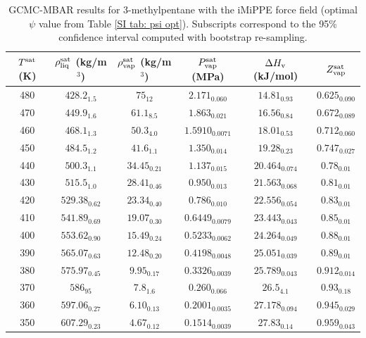 \documentclass[journal=jctc,manuscript=article]{achemso}
\begin{document}
\begin{table}[htb!]
	\caption{GCMC-MBAR results for 3-methylpentane with the iMiPPE force field (optimal $\psi$ value from Table \ref{SI tab: psi opt}). Subscripts correspond to the 95\% confidence interval computed with bootstrap re-sampling.}
	\begin{center}
		\begin{tabular}{|c|c|c|c|c|c|}
			\hline
			$T^{\rm sat}$ (K) & $\rho_{\rm liq}^{\rm sat}$ (kg/m$^3$) & $\rho_{\rm vap}^{\rm sat}$ (kg/m$^3$) & $P_{\rm vap}^{\rm sat}$ (MPa) & $\Delta H_{\rm v}$ (kJ/mol) & $Z_{\rm vap}^{\rm sat}$ \\ \hline
			480 & $428.2_{1.5}$ & $75_{12}$ & $2.171_{0.060}$ & $14.81_{0.93}$ & $0.625_{0.090}$ \\
			470 & $449.9_{1.6}$ & $61.1_{8.5}$ & $1.863_{0.021}$ & $16.56_{0.84}$ & $0.672_{0.089}$ \\
			460 & $468.1_{1.3}$ & $50.3_{4.0}$ & $1.5910_{0.0071}$ & $18.01_{0.53}$ & $0.712_{0.060}$ \\
			450 & $484.5_{1.2}$ & $41.6_{1.1}$ & $1.350_{0.014}$ & $19.28_{0.23}$ & $0.747_{0.027}$ \\
			440 & $500.3_{1.1}$ & $34.45_{0.21}$ & $1.137_{0.015}$ & $20.464_{0.074}$ & $0.78_{0.01}$ \\
			430 & $515.5_{1.0}$ & $28.41_{0.46}$ & $0.950_{0.013}$ & $21.563_{0.068}$ & $0.81_{0.01}$ \\
			420 & $529.38_{0.62}$ & $23.34_{0.40}$ & $0.786_{0.010}$ & $22.556_{0.054}$ & $0.83_{0.01}$ \\
			410 & $541.89_{0.69}$ & $19.07_{0.30}$ & $0.6449_{0.0079}$ & $23.443_{0.043}$ & $0.85_{0.01}$ \\
			400 & $553.62_{0.90}$ & $15.49_{0.24}$ & $0.5233_{0.0062}$ & $24.264_{0.049}$ & $0.88_{0.01}$ \\
			390 & $565.07_{0.63}$ & $12.48_{0.20}$ & $0.4198_{0.0048}$ & $25.051_{0.039}$ & $0.89_{0.01}$ \\
			380 & $575.97_{0.45}$ & $9.95_{0.17}$ & $0.3326_{0.0039}$ & $25.789_{0.043}$ & $0.912_{0.014}$ \\
			370 & $586_{95}$ & $7.8_{1.6}$ & $0.260_{0.066}$ & $26.5_{4.1}$ & $0.93_{0.18}$ \\
			360 & $597.06_{0.27}$ & $6.10_{0.13}$ & $0.2001_{0.0035}$ & $27.178_{0.094}$ & $0.945_{0.029}$ \\
			350 & $607.29_{0.23}$ & $4.67_{0.12}$ & $0.1514_{0.0039}$ & $27.83_{0.14}$ & $0.959_{0.043}$ \\
			\hline
		\end{tabular}
	\end{center}
\end{table}
\end{document}
